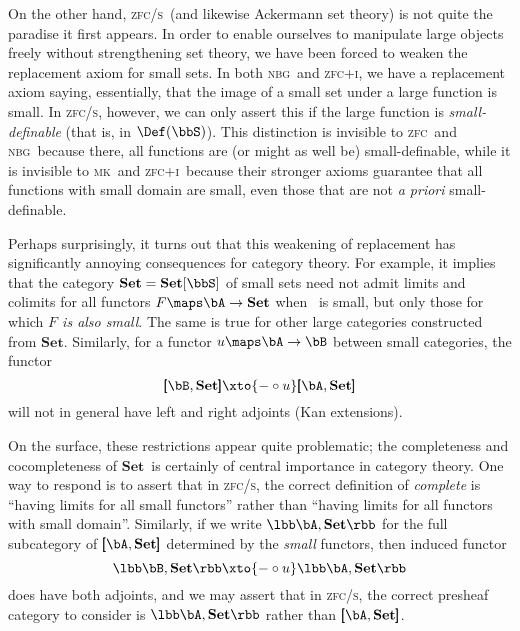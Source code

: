 \documentclass[12pt]{amsart}
\newcommand{\Set}{\ensuremath{\mathbf{Set}}}
\def\zfc{\textsc{zfc}}
\def\zfci{\textsc{zfc+i}}
\def\zfcs{\textsc{zfc/s}}
\def\nbg{\textsc{nbg}}
\def\mk{\textsc{mk}}
\begin{document}
On the other hand, \zfcs\ (and likewise Ackermann set theory) is not
quite the paradise it first appears.  In order to enable ourselves to
manipulate large objects freely without strengthening set theory, we
have been forced to weaken the replacement axiom for small sets.  In
both \nbg\ and \zfci, we have a replacement axiom saying, essentially,
that the image of a small set under a large function is small.  In
\zfcs, however, we can only assert this if the large function is
\emph{small-definable} (that is, in $\Def(\bbS)$).  This distinction
is invisible to \zfc\ and \nbg\ because there, all functions are (or
might as well be) small-definable, while it is invisible to \mk\ and
\zfci\ because their stronger axioms guarantee that all functions with
small domain are small, even those that are not \emph{a priori}
small-definable.

Perhaps surprisingly, it turns out that this weakening of replacement
has significantly annoying consequences for category theory.  For
example, it implies that the category $\Set=\Set[\bbS]$ of small sets
need not admit limits and colimits for all functors $F\maps \bA\to
\Set$ when \bA\ is small, but only those for which \emph{$F$ is also
  small}.  The same is true for other large categories constructed
from \Set.  Similarly, for a functor $u\maps \bA\to\bB$ between small
categories, the functor
\[\pmb[\bB,\Set\pmb] \xto{-\circ u} \pmb[\bA,\Set\pmb]
\]
will not in general have left and right adjoints (Kan extensions).

On the surface, these restrictions appear quite problematic; the
completeness and cocompleteness of \Set\ is certainly of central
importance in category theory.  One way to respond is to assert that
in \zfcs, the correct definition of \emph{complete} is ``having limits
for all small functors'' rather than ``having limits for all functors
with small domain''.  Similarly, if we write $\lbb\bA,\Set\rbb$ for
the full subcategory of $\pmb[\bA,\Set\pmb]$ determined by the
\emph{small} functors, then induced functor
\[\lbb\bB,\Set\rbb \xto{-\circ u} \lbb\bA,\Set\rbb
\]
does have both adjoints, and we may assert that in \zfcs, the correct
presheaf category to consider is $\lbb\bA,\Set\rbb$ rather than
$\pmb[\bA,\Set\pmb]$.
\end{document}
